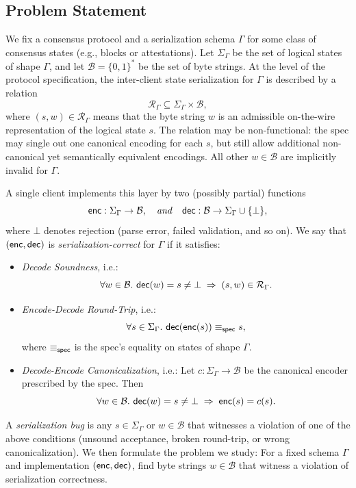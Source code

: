 \subsection{Problem Statement}\label{subsec:problem}

We fix a consensus protocol and a serialization schema \(\Gamma\) for some class of consensus states (e.g., blocks or attestations). Let \(\Sigma_\Gamma\) be the set of logical states of shape \(\Gamma\), and let \(\mathcal{B} = \{0,1\}^\ast\) be the set of byte strings. At the level of the protocol specification, the inter-client state serialization for \(\Gamma\) is described by a relation
\[
    \mathcal{R}_\Gamma \subseteq \Sigma_\Gamma \times \mathcal{B},
\]
where \((s,w) \in \mathcal{R}_\Gamma\) means that the byte string \(w\) is an admissible on-the-wire representation of the logical state \(s\). The relation may be non-functional: the spec may single out one canonical encoding for each \(s\), but still allow additional non-canonical yet semantically equivalent encodings. All other \(w \in \mathcal{B}\) are implicitly invalid for \(\Gamma\).

A single client implements this layer by two (possibly partial) functions
\[
    {\sf enc} : \Sigma_\Gamma \to \mathcal{B},
    \quad \mathit{and} \quad
    {\sf dec} : \mathcal{B} \to \Sigma_\Gamma \cup \{\bot\},
\]
where \(\bot\) denotes rejection (parse error, failed validation, and so on). We say that \(({\sf enc},{\sf dec})\) is \emph{serialization-correct} for \(\Gamma\) if it satisfies:
\begin{itemize}
    \item \emph{Decode Soundness}, i.e.:
    \[
        \forall w \in \mathcal{B}.\ {\sf dec}(w) = s \neq \bot \;\Rightarrow\; (s,w) \in \mathcal{R}_\Gamma.
    \]
    \item \emph{Encode-Decode Round-Trip}, i.e.:
    \[
        \forall s \in \Sigma_\Gamma.\ {\sf dec}({\sf enc}(s)) \equiv_{\sf spec} s,
    \]
    where \(\equiv_{\sf spec}\) is the spec’s equality on states of shape \(\Gamma\).
    \item \emph{Decode-Encode Canonicalization}, i.e.: Let \(c : \Sigma_\Gamma \to \mathcal{B}\) be the canonical encoder prescribed by the spec. Then
    \[
        \forall w \in \mathcal{B}.\ {\sf dec}(w) = s \neq \bot \;\Rightarrow\; {\sf enc}(s) = c(s).
    \]
    
\end{itemize}

A \emph{serialization bug} is any \(s \in \Sigma_\Gamma\) or \(w \in \mathcal{B}\) that witnesses a violation of one of the above conditions (unsound acceptance, broken round-trip, or wrong canonicalization). We then formulate the problem we study: For a fixed schema \(\Gamma\) and implementation \(({\sf enc},{\sf dec})\), find byte strings \(w \in \mathcal{B}\) that witness a violation of serialization correctness.

